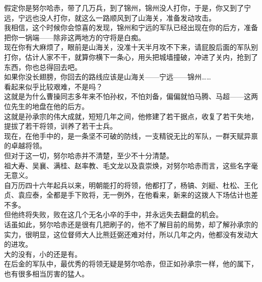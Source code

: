 \begin{multicols}{\theparacolNo}
假定你是努尔哈赤，带了几万兵，到了锦州，锦州没人打你，于是，你又到了宁远，宁远也没人打你，就这么一路顺风到了山海关，准备发动攻击。\\

我相信，这个时候你会惊喜的发现，锦州和宁远的军队已经出现在你的后方，准备把你一锅端——除非这两地方的守将是白痴。\\

现在你有大麻烦了，眼前是山海关，没准十天半月攻不下来，请屁股后面的军队别打你，估计人家不干，就算你横下一条心，用头把城墙撞破，冲进了关内，抢到了东西，你也总得回去吧。\\

如果你没长翅膀，你回去的路线应该是山海关——宁远——锦州……\\

看起来似乎比较艰难，不是吗？\\

这就是为什么曹操同志多年来不怕孙权，不怕刘备，偏偏就怕马腾、马超——这两位先生的地盘在他的后方。\\

这就是孙承宗的伟大成就，短短几年之间，他修建了若干据点，收复了若干失地，提拔了若干将领，训养了若干士兵。\\

现在，在他手中的，是一条坚不可破的防线，一支精锐无比的军队，一群天赋异禀的卓越将领。\\

但对于这一切，努尔哈赤并不清楚，至少不十分清楚。\\

祖大寿、吴襄、满桂、赵率教、毛文龙以及袁崇焕，对努尔哈赤而言，这些名字毫无意义。\\

自万历四十六年起兵以来，明朝能打的将领，他都打了，杨镐、刘綎、杜松、王化贞、袁应泰，全都是手下败将，无一例外，在他看来，新来的这拨人下场估计也差不多。\\

但他终将失败，败在这几个无名小卒的手中，并永远失去翻盘的机会。\\

话虽如此，努尔哈赤还是很有几把刷子的，他不了解目前的局势，却了解孙承宗的实力，很明显，这位督师大人比熊廷弼还难对付，所以几年之内，他都没有发动大的进攻。\\

大的没有，小的还是有。\\

在后金的军队中，最优秀的将领无疑是努尔哈赤，但正如孙承宗一样，他的属下，也有很多相当厉害的猛人。\\


\end{multicols}
